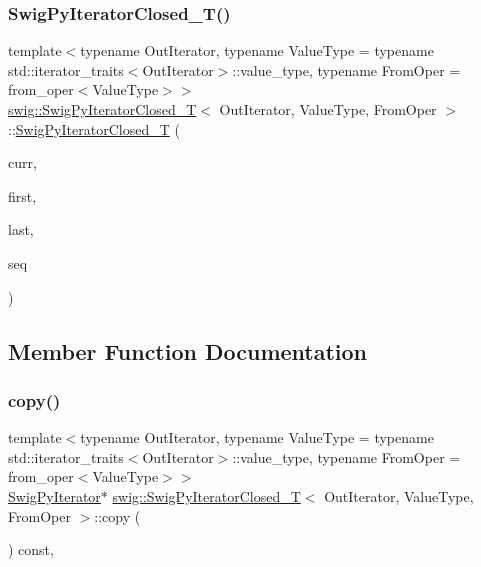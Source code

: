 \subsubsection{\texorpdfstring{Swig\+Py\+Iterator\+Closed\+\_\+\+T()}{SwigPyIteratorClosed\_T()}}
{\footnotesize\ttfamily template$<$typename Out\+Iterator, typename Value\+Type = typename std\+::iterator\+\_\+traits$<$\+Out\+Iterator$>$\+::value\+\_\+type, typename From\+Oper = from\+\_\+oper$<$\+Value\+Type$>$$>$ \\
\hyperlink{classswig_1_1_swig_py_iterator_closed___t}{swig\+::\+Swig\+Py\+Iterator\+Closed\+\_\+T}$<$ Out\+Iterator, Value\+Type, From\+Oper $>$\+::\hyperlink{classswig_1_1_swig_py_iterator_closed___t}{Swig\+Py\+Iterator\+Closed\+\_\+T} (\begin{DoxyParamCaption}\item[{\hyperlink{classswig_1_1_swig_py_iterator___t_aec35545038c3d804975a147253f061e4}{out\+\_\+iterator}}]{curr,  }\item[{\hyperlink{classswig_1_1_swig_py_iterator___t_aec35545038c3d804975a147253f061e4}{out\+\_\+iterator}}]{first,  }\item[{\hyperlink{classswig_1_1_swig_py_iterator___t_aec35545038c3d804975a147253f061e4}{out\+\_\+iterator}}]{last,  }\item[{Py\+Object $\ast$}]{seq }\end{DoxyParamCaption})\hspace{0.3cm}{\ttfamily [inline]}}



\subsection{Member Function Documentation}
\mbox{\label{classswig_1_1_swig_py_iterator_closed___t_afa43a5af55b0f4ddee56308cb6c72eba}} 
\subsubsection{\texorpdfstring{copy()}{copy()}}
{\footnotesize\ttfamily template$<$typename Out\+Iterator, typename Value\+Type = typename std\+::iterator\+\_\+traits$<$\+Out\+Iterator$>$\+::value\+\_\+type, typename From\+Oper = from\+\_\+oper$<$\+Value\+Type$>$$>$ \\
\hyperlink{structswig_1_1_swig_py_iterator}{Swig\+Py\+Iterator}$\ast$ \hyperlink{classswig_1_1_swig_py_iterator_closed___t}{swig\+::\+Swig\+Py\+Iterator\+Closed\+\_\+T}$<$ Out\+Iterator, Value\+Type, From\+Oper $>$\+::copy (\begin{DoxyParamCaption}{ }\end{DoxyParamCaption}) const\hspace{0.3cm}{\ttfamily [inline]}, {\ttfamily [virtual]}}



